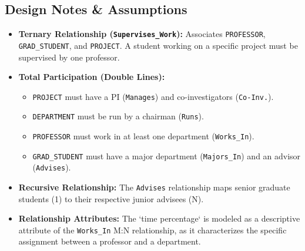 \documentclass[12pt,a3paper]{article}
\begin{document}
\begin{enumerate}
\begin{tcolorbox}[enhanced,breakable,ansbox,colback=cA!4,colframe=cA,boxrule=0.8pt,arc=5pt,title={\textbf{Answer}},fonttitle=\bfseries\color{white},colbacktitle=cA]
\begin{center}
\end{center}

\vspace{1em}
\subsection*{Design Notes \& Assumptions}
\begin{itemize}
    \item \textbf{Ternary Relationship (\texttt{Supervises\_Work}):} Associates \texttt{PROFESSOR}, \texttt{GRAD\_STUDENT}, and \texttt{PROJECT}. A student working on a specific project must be supervised by one professor.
    \item \textbf{Total Participation (Double Lines):} 
    \begin{itemize}
        \item \texttt{PROJECT} must have a PI (\texttt{Manages}) and co-investigators (\texttt{Co-Inv.}).
        \item \texttt{DEPARTMENT} must be run by a chairman (\texttt{Runs}).
        \item \texttt{PROFESSOR} must work in at least one department (\texttt{Works\_In}).
        \item \texttt{GRAD\_STUDENT} must have a major department (\texttt{Majors\_In}) and an advisor (\texttt{Advises}).
    \end{itemize}
    \item \textbf{Recursive Relationship:} The \texttt{Advises} relationship maps senior graduate students (1) to their respective junior advisees (N).
    \item \textbf{Relationship Attributes:} The `time percentage` is modeled as a descriptive attribute of the \texttt{Works\_In} M:N relationship, as it characterizes the specific assignment between a professor and a department.
\end{itemize}

\end{tcolorbox}


\end{enumerate}
\end{document}
